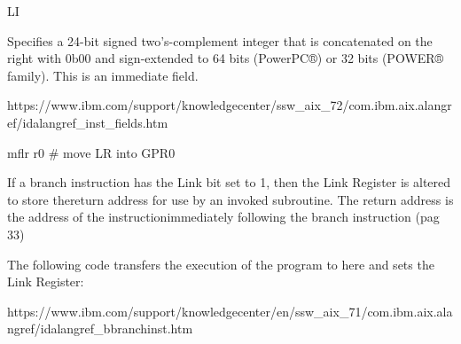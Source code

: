 \documentclass[10pt,a4paper, titlepage]{report}
\begin{document}
    LI
    
 	Specifies a 24-bit signed two's-complement integer that is concatenated on the right with 0b00 and sign-extended to 64 bits (PowerPC®) or 32 bits (POWER® family). This is an immediate field.

 	https://www.ibm.com/support/knowledgecenter/ssw\_aix\_72/com.ibm.aix.alangref/idalangref\_inst\_fields.htm
 	
 	mflr r0 \# move LR into GPR0
 	
 	 If a branch instruction has the Link bit set to 1, then the Link Register is altered to store thereturn address for use by an invoked subroutine. The return address is the address of the instructionimmediately following the branch instruction (pag 33)


The following code transfers the execution of the program to here and sets the Link Register: 

https://www.ibm.com/support/knowledgecenter/en/ssw\_aix\_71/com.ibm.aix.alangref/idalangref\_bbranchinst.htm


\listoffigures
\listoftables
\lstlistoflistings
\end{document}
